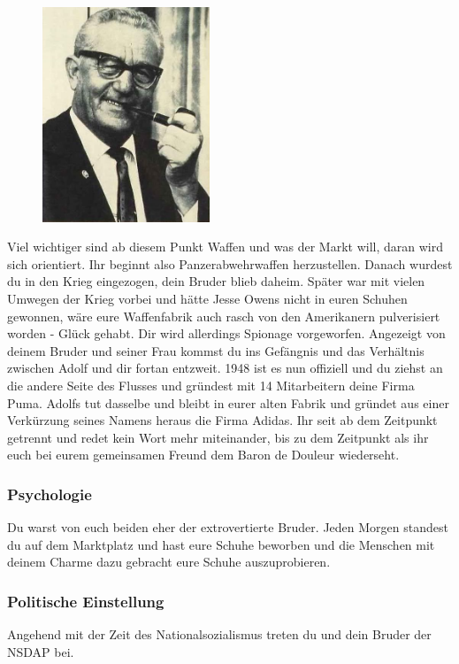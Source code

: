 \documentclass[12pt, a4paper, openany]{report}
\begin{document}
\begin{figure}[h!]
\centering
\includegraphics[width=5cm]{Rudi_Dassler.jpg}
\end{figure}

Viel wichtiger sind ab diesem Punkt Waffen und was der Markt will, daran wird sich orientiert. Ihr beginnt also Panzerabwehrwaffen herzustellen. Danach wurdest du in den Krieg eingezogen, dein Bruder blieb daheim. Später war mit vielen Umwegen der Krieg vorbei und hätte Jesse Owens nicht in euren Schuhen gewonnen, wäre eure Waffenfabrik auch rasch von den Amerikanern pulverisiert worden - Glück gehabt. Dir wird allerdings Spionage vorgeworfen. Angezeigt von deinem Bruder und seiner Frau kommst du ins Gefängnis und das Verhältnis zwischen Adolf und dir fortan entzweit. 1948 ist es nun offiziell und du ziehst an die andere Seite des Flusses und gründest mit 14 Mitarbeitern deine Firma Puma. Adolfs tut dasselbe und bleibt in eurer alten Fabrik und gründet aus einer Verkürzung seines Namens heraus die Firma Adidas. Ihr seit ab dem Zeitpunkt getrennt und redet kein Wort mehr miteinander, bis zu dem Zeitpunkt als ihr euch bei eurem gemeinsamen Freund dem Baron de Douleur wiederseht. 



\subsubsection{Psychologie}
Du warst von euch beiden eher der extrovertierte Bruder. Jeden Morgen standest du auf dem Marktplatz und hast eure Schuhe beworben und die Menschen mit deinem Charme dazu gebracht eure Schuhe auszuprobieren. 

\subsubsection{Politische Einstellung}
Angehend mit der Zeit des Nationalsozialismus treten du und dein Bruder der NSDAP bei. 
\end{document}
